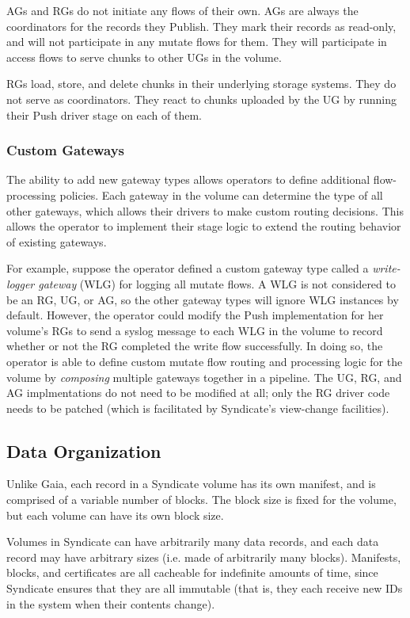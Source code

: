 AGs and RGs do not initiate any flows of
their own.  AGs are always the coordinators for the records they Publish.  They mark their
records as read-only, and will not participate in any mutate flows for them.
They will participate in access flows to serve chunks to other UGs in the volume.

RGs load, store, and delete chunks in their underlying storage systems.  They do
not serve as coordinators.  They react to chunks uploaded by the UG by running
their Push driver stage on each of them.

\subsubsection{Custom Gateways}

The ability to add new gateway types allows operators to define additional
flow-processing policies.  Each gateway in the volume can determine the type of
all other gateways, which allows their drivers to make custom routing decisions.
This allows the operator to implement their stage logic to extend the
routing behavior of existing gateways.

For example, suppose the operator defined a custom gateway
type called a \emph{write-logger gateway} (WLG) for logging all mutate flows.
A WLG is not considered to be
an RG, UG, or AG, so the other gateway types will ignore WLG instances by
default.  However, the operator could modify the Push implementation for
her volume's RGs to send a syslog message to each WLG in the volume to record
whether or not the RG completed the write flow successfully.  In doing so, the
operator is able to define custom mutate flow routing and processing
logic for the volume by \emph{composing} multiple gateways together in a
pipeline.  The UG, RG, and AG implmentations do not need to be modified at all;
only the RG driver code needs to be patched (which is facilitated by Syndicate's
view-change facilities).

\subsection{Data Organization}

Unlike Gaia, each record in a Syndicate volume has its own manifest, and is
comprised of a variable number of blocks.  The block size is fixed for the
volume, but each volume can have its own block size.

Volumes in Syndicate can have arbitrarily many data records, and each data
record may have arbitrary sizes (i.e. made of arbitrarily many blocks).
Manifests, blocks, and certificates are all cacheable for
indefinite amounts of time, since Syndicate ensures that they are all immutable
(that is, they each receive new IDs in the system when their contents change).

